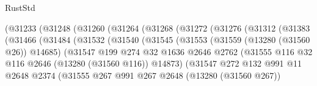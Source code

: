 \begin{lexlean}{RustStd}
\begin{coremodule}
                          (@31233
                            (@31248
                              (@31260
                                (@31264
                                  (@31268
                                    (@31272
                                      (@31276
                                        (@31312
                                          (@31383
                                            (@31466
                                              (@31484
                                                (@31532
                                                  (@31540
                                                    (@31545
                                                      (@31553
                                                        (@31559 (@13280 (@31560 @26)) @14685)
                                                        (@31547
                                                          @199
                                                          @274
                                                          @32
                                                          @1636
                                                          @2646
                                                          @2762
                                                          (@31555
                                                            @116
                                                            @32
                                                            @116
                                                            @2646
                                                            (@13280 (@31560 @116))
                                                            @14873)
                                                          (@31547
                                                            @272
                                                            @132
                                                            @991
                                                            @11
                                                            @2648
                                                            @2374
                                                            (@31555
                                                              @267
                                                              @991
                                                              @267
                                                              @2648
                                                              (@13280 (@31560 @267))

\end{coremodule}
\end{lexlean}
